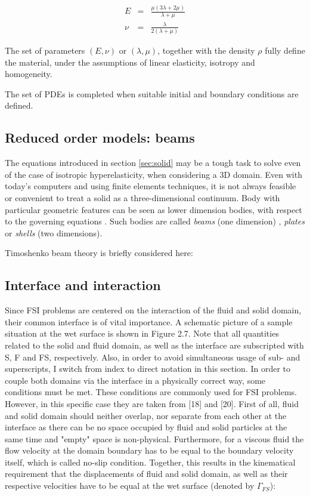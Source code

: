 \begin{eqnarray}
	E &=& \frac{\mu(3\lambda+2\mu)}{\lambda + \mu} \\
	\nu &=& \frac{\lambda}{2(\lambda + \mu)}
\end{eqnarray}

The set of parameters $\left(E, \nu\right)$ or $\left(\lambda, \mu \right)$, together with the density $\rho$ fully define the material, under the assumptions of linear elasticity, isotropy and homogeneity.

The set of PDEs is completed when suitable initial and boundary conditions are defined.

\subsection{Reduced order models: beams}
\label{sec:beam}

The equations introduced in section \ref{sec:solid} may be a tough task to solve even of the case of isotropic hyperelasticity, when considering a 3D domain. Even with today's computers and using finite elements techniques, it is not always feasible or convenient to treat a solid as a three-dimensional continuum. Body with particular geometric features can be seen as lower dimension bodies, with respect to the governing equations \cite{hjelmstad2007fundamentals}. Such bodies are called \textit{beams} (one dimension) , \textit{plates} or \textit{shells} (two dimensions).

Timoshenko beam theory is briefly considered here: \cite{ghiringhelli2008integrated}
 


\subsection{Interface and interaction}
\label{sec:interface}

Since FSI problems are centered on the interaction of the fluid and solid domain, their common interface
is of vital importance. A schematic picture of a sample situation at the wet surface is shown in Figure
2.7. Note that all quantities related to the solid and fluid domain, as well as the interface are subscripted
with S, F and FS, respectively. Also, in order to avoid simultaneous usage of sub- and superscripts, I
switch from index to direct notation in this section. In order to couple both domains via the interface
in a physically correct way, some conditions must be met. These conditions are commonly used for FSI
problems. However, in this specific case they are taken from [18] and [20].
First of all, fluid and solid domain should neither overlap, nor separate from each other at the interface
as there can be no space occupied by fluid and solid particles at the same time and "empty" space is non-physical. Furthermore, for a viscous fluid the flow velocity at the domain boundary has to be equal
to the boundary velocity itself, which is called no-slip condition. Together, this results in the kinematical
requirement that the displacements of fluid and solid domain, as well as their respective velocities have
to be equal at the wet surface (denoted by $\Gamma_{FS}$):

